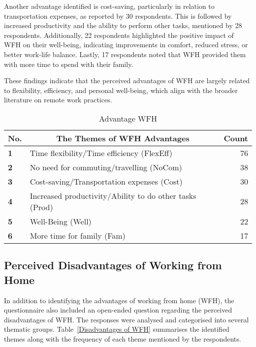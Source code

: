 \documentclass[a4paper, conference]{IEEEtran}
\begin{document}
Another advantage identified is cost-saving, particularly in relation to transportation expenses, as reported by 30 respondents. This is followed by increased productivity and the ability to perform other tasks, mentioned by 28 respondents. Additionally, 22 respondents highlighted the positive impact of WFH on their well-being, indicating improvements in comfort, reduced stress, or better work-life balance. Lastly, 17 respondents noted that WFH provided them with more time to spend with their family.

These findings indicate that the perceived advantages of WFH are largely related to flexibility, efficiency, and personal well-being, which align with the broader literature on remote work practices.

\begin{table}[ht]
	\caption{Advantage WFH}
	\label{Advantage of WFH}
	\begin{tabular}{|p{}|p{}|r|}
		\hline
		\multicolumn{1}{|c|}{\textbf{No.}} & \multicolumn{1}{c|}{\textbf{The Themes of WFH Advantages}} & \textbf{Count} \\ \hline
		\textbf{1}                 & Time flexibility/Time efficiency (FlexEff)         &76 %
		\\ \hline
		\textbf{2}                 & No need for commuting/travelling (NoCom)        & 38 %
		\\ \hline
		\textbf{3}                 & Cost-saving/Transportation expenses (Cost)        & 30 %
		\\ \hline
		\textbf{4}                 & Increased productivity/Ability to do other tasks (Prod)& 28 %
		\\ \hline
		\textbf{5}                 & Well-Being (Well)        & 22     
		\\ \hline
		\textbf{6}                 & More time for family (Fam)              & 17 %
		\\ \hline
	\end{tabular}
\end{table}

\subsection{Perceived Disadvantages of Working from Home}
\label{sec:disadvantage-wfh}

In addition to identifying the advantages of working from home (WFH), the questionnaire also included an open-ended question regarding the perceived disadvantages of WFH. The responses were analysed and categorised into several thematic groups. Table~\ref{Disadvantages of WFH} summarises the identified themes along with the frequency of each theme mentioned by the respondents.
\end{document}
